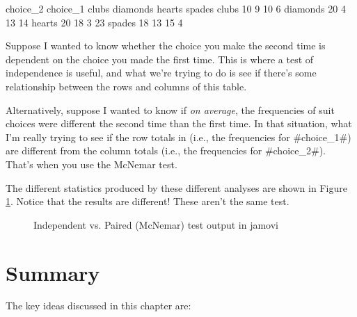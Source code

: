 \begin{rblock1}
          choice_2
choice_1   clubs diamonds hearts spades
  clubs       10        9     10      6
  diamonds    20        4     13     14
  hearts      20       18      3     23
  spades      18       13     15      4
\end{rblock1}

Suppose I wanted to know whether the choice you make the second time is dependent on the choice you made the first time. This is where a test of independence is useful, and what we're trying to do is see if there's some relationship between the rows and columns of this table. 

Alternatively, suppose I wanted to know if {\it on average}, the frequencies of suit choices were different the second time than the first time. In that situation, what I'm really trying to see if the row totals in  (i.e., the frequencies for \rtextverb#choice_1#) are different from the column totals (i.e., the frequencies for \rtextverb#choice_2#). That's when you use the McNemar test.

The different statistics produced by these different analyses are shown in Figure \ref{fig:ind_paired}. 
Notice that the results are different! These aren't the same test. 

\begin{figure}
\begin{center}
\caption{Independent vs. Paired (McNemar) test output in jamovi}
\label{fig:ind_paired}
\HR
\end{center}
\end{figure}


\section{Summary}

The key ideas discussed in this chapter are:

